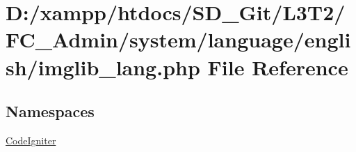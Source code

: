 \hypertarget{_admin_2system_2language_2english_2imglib__lang_8php}{}\section{D\+:/xampp/htdocs/\+S\+D\+\_\+\+Git/\+L3\+T2/\+F\+C\+\_\+\+Admin/system/language/english/imglib\+\_\+lang.php File Reference}
\label{_admin_2system_2language_2english_2imglib__lang_8php}
\subsection*{Namespaces}
\begin{DoxyCompactItemize}
\item 
 \hyperlink{namespace_code_igniter}{Code\+Igniter}
\end{DoxyCompactItemize}
